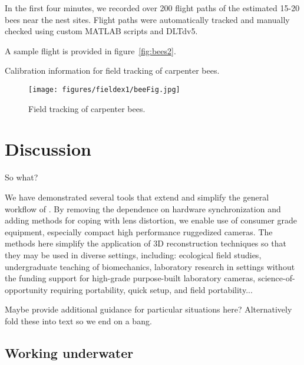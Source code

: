\documentclass[fleqn,10pt]{wlpeerj}
\begin{document}
In the first four minutes, we recorded over 200 flight paths of the estimated 15-20 bees near the nest sites.  Flight paths were automatically tracked and manually checked using custom MATLAB scripts and DLTdv5.  

A sample flight is provided in figure~\ref{fig:bees2}.  


\begin{table}
\caption{Calibration information for field tracking of carpenter bees.}
\label{tab:bees1}
\end{table}

\begin{figure}
\texttt{[image: figures/fieldex1/beeFig.jpg]}
\caption{Field tracking of carpenter bees. }
\label{tab:bees2}
\end{figure}






  
\section*{Discussion}
So what?

We have demonstrated several tools that extend and simplify the general workflow of \citet{Theriault:2014}.  By removing the dependence on hardware synchronization and adding methods for coping with lens distortion, we enable use of consumer grade equipment, especially compact high performance ruggedized cameras.  The methods here simplify the application of 3D reconstruction techniques so that they may be used in diverse settings, including: ecological field studies, undergraduate teaching of biomechanics, laboratory research in settings without the funding support for high-grade purpose-built laboratory cameras, science-of-opportunity requiring portability, quick setup, and field portability... 

Maybe provide additional guidance for particular situations here? Alternatively fold these into text so we end on a bang. 

\subsection*{Working underwater}
\end{document}
